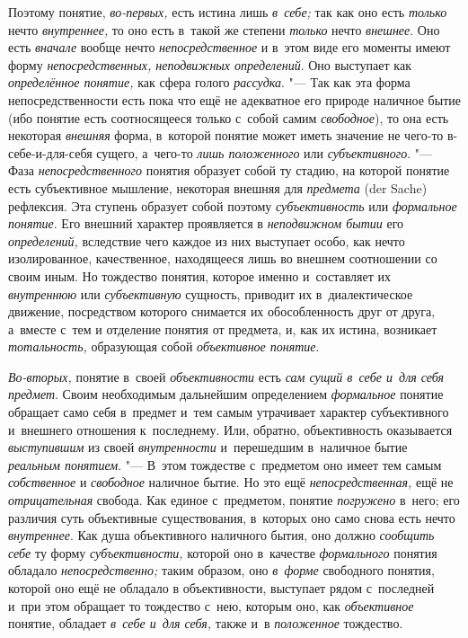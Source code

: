 Поэтому понятие, {\em во-первых,} есть истина лишь {\em в~себе;}
так как оно есть {\em только} нечто {\em внутреннее,} то оно
есть в~такой же степени {\em только} нечто {\em внешнее}.
Оно есть {\em вначале} вообще нечто {\em непосредственное} и
в~этом виде его моменты имеют форму {\em непосредственных, неподвижных
определений}. Оно выступает как {\em определённое понятие,}
как сфера голого {\em рассудка}. "--- Так как
эта форма непосредственности есть пока что ещё не адекватное его природе
наличное бытие (ибо понятие есть соотносящееся только с~собой самим
{\em свободное}), то она есть некоторая {\em внешняя}
форма, в~которой понятие может иметь значение не чего-то
в-себе-и-для-себя сущего, а~чего-то {\em лишь положенного}
или {\em субъективного}. "--- Фаза {\em непосредственного}
понятия образует собой ту стадию, на которой понятие есть
субъективное мышление, некоторая внешняя для {\em предмета} (der Sache)
рефлексия. Эта ступень образует собой поэтому {\em субъективность} или
{\em формальное понятие}. Его внешний характер проявляется в
{\em неподвижном бытии} его {\em определений,}
вследствие чего каждое из них выступает особо, как нечто
изолированное, качественное, находящееся лишь во внешнем соотношении со
своим иным. Но тождество понятия, которое именно и~составляет их
{\em внутреннюю} или {\em субъективную}
сущность, приводит их в~диалектическое движение, посредством
которого снимается их обособленность друг от друга, а~вместе с~тем и
отделение понятия от предмета, и, как их истина, возникает
{\em тотальность,} образующая собой {\em объективное понятие}.

{\em Во-вторых,} понятие в~своей {\em объективности}
есть {\em сам сущий в~себе и~для себя предмет}. Своим необходимым дальнейшим
определением {\em формальное}
понятие обращает само себя в~предмет и~тем самым утрачивает
характер субъективного и~внешнего отношения к~последнему. Или, обратно,
объективность оказывается {\em выступившим} из своей {\em внутренности}
и~перешедшим в~наличное бытие {\em реальным понятием}. "---
В~этом тождестве с~предметом оно имеет тем самым {\em собственное} и
{\em свободное} наличное бытие. Но это ещё {\em непосредственная,}
ещё не {\em отрицательная} свобода. Как единое с~предметом, понятие
{\em погружено} в~него;
его различия суть объективные существования, в~которых оно само снова есть
нечто {\em внутреннее}. Как душа объективного наличного бытия, оно должно
{\em сообщить себе} ту форму {\em субъективности,} которой оно в~качестве
{\em формального} понятия обладало {\em непосредственно;} таким образом, оно
{\em в~форме} свободного понятия, которой оно ещё не обладало в
объективности, выступает рядом с~последней и~при этом обращает то тождество
с~нею, которым оно, как {\em объективное} понятие, обладает
{\em в~себе и~для себя,} также и~в {\em положенное} тождество.

